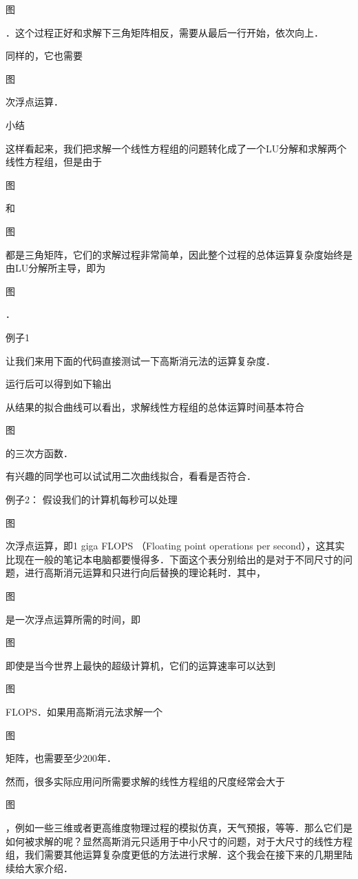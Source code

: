 图

 ．这个过程正好和求解下三角矩阵相反，需要从最后一行开始，依次向上．

同样的，它也需要

图

 次浮点运算．

小结

这样看起来，我们把求解一个线性方程组的问题转化成了一个LU分解和求解两个线性方程组，但是由于

图

 和

图

 都是三角矩阵，它们的求解过程非常简单，因此整个过程的总体运算复杂度始终是由LU分解所主导，即为

图

 ．

例子1

让我们来用下面的代码直接测试一下高斯消元法的运算复杂度．

运行后可以得到如下输出

从结果的拟合曲线可以看出，求解线性方程组的总体运算时间基本符合

图

 的三次方函数．
 
 有兴趣的同学也可以试试用二次曲线拟合，看看是否符合．

例子2： 假设我们的计算机每秒可以处理

图

 次浮点运算，即1 giga FLOPS （Floating point operations per second），这其实比现在一般的笔记本电脑都要慢得多．下面这个表分别给出的是对于不同尺寸的问题，进行高斯消元运算和只进行向后替换的理论耗时．其中，

图

 是一次浮点运算所需的时间，即

图

 
即使是当今世界上最快的超级计算机，它们的运算速率可以达到

图

 FLOPS．如果用高斯消元法求解一个

图

 矩阵，也需要至少200年．

然而，很多实际应用问所需要求解的线性方程组的尺度经常会大于

图

 ，例如一些三维或者更高维度物理过程的模拟仿真，天气预报，等等．那么它们是如何被求解的呢？显然高斯消元只适用于中小尺寸的问题，对于大尺寸的线性方程组，我们需要其他运算复杂度更低的方法进行求解．这个我会在接下来的几期里陆续给大家介绍．
